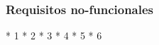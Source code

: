 \subsubsection{Requisitos no-funcionales}

\begin{markdown}
* 1
* 2
* 3
* 4
* 5
* 6
\end{markdown}









